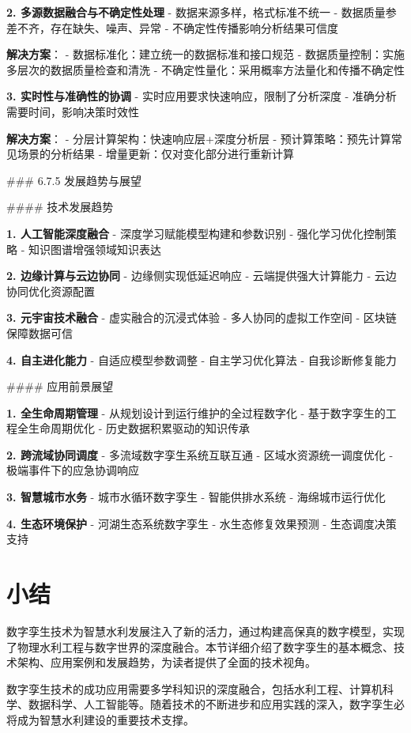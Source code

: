 \textbf{2. 多源数据融合与不确定性处理} - 数据来源多样，格式标准不统一 - 数据质量参差不齐，存在缺失、噪声、异常 - 不确定性传播影响分析结果可信度

\textbf{解决方案}： - 数据标准化：建立统一的数据标准和接口规范 - 数据质量控制：实施多层次的数据质量检查和清洗 - 不确定性量化：采用概率方法量化和传播不确定性

\textbf{3. 实时性与准确性的协调} - 实时应用要求快速响应，限制了分析深度 - 准确分析需要时间，影响决策时效性

\textbf{解决方案}： - 分层计算架构：快速响应层+深度分析层 - 预计算策略：预先计算常见场景的分析结果 - 增量更新：仅对变化部分进行重新计算

\#\#\# 6.7.5 发展趋势与展望

\#\#\#\# 技术发展趋势

\textbf{1. 人工智能深度融合} - 深度学习赋能模型构建和参数识别 - 强化学习优化控制策略 - 知识图谱增强领域知识表达

\textbf{2. 边缘计算与云边协同} - 边缘侧实现低延迟响应 - 云端提供强大计算能力 - 云边协同优化资源配置

\textbf{3. 元宇宙技术融合} - 虚实融合的沉浸式体验 - 多人协同的虚拟工作空间 - 区块链保障数据可信

\textbf{4. 自主进化能力} - 自适应模型参数调整 - 自主学习优化算法 - 自我诊断修复能力

\#\#\#\# 应用前景展望

\textbf{1. 全生命周期管理} - 从规划设计到运行维护的全过程数字化 - 基于数字孪生的工程全生命周期优化 - 历史数据积累驱动的知识传承

\textbf{2. 跨流域协同调度} - 多流域数字孪生系统互联互通 - 区域水资源统一调度优化 - 极端事件下的应急协调响应

\textbf{3. 智慧城市水务} - 城市水循环数字孪生 - 智能供排水系统 - 海绵城市运行优化

\textbf{4. 生态环境保护} - 河湖生态系统数字孪生 - 水生态修复效果预测 - 生态调度决策支持

\section{小结}

数字孪生技术为智慧水利发展注入了新的活力，通过构建高保真的数字模型，实现了物理水利工程与数字世界的深度融合。本节详细介绍了数字孪生的基本概念、技术架构、应用案例和发展趋势，为读者提供了全面的技术视角。

数字孪生技术的成功应用需要多学科知识的深度融合，包括水利工程、计算机科学、数据科学、人工智能等。随着技术的不断进步和应用实践的深入，数字孪生必将成为智慧水利建设的重要技术支撑。

